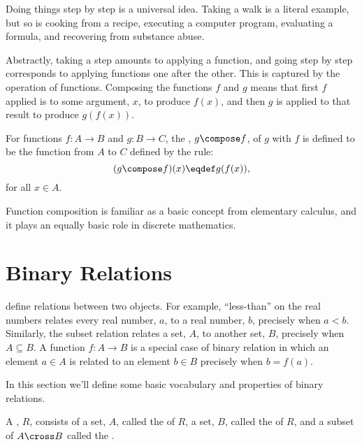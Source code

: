 Doing things step by step is a universal idea.  Taking a walk is a literal
example, but so is cooking from a recipe, executing a computer program,
evaluating a formula, and recovering from substance abuse.

Abstractly, taking a step amounts to applying a function, and going step
by step corresponds to applying functions one after the other.  This is
captured by the operation of  functions.  Composing the
functions $f$ and $g$ means that first $f$ applied is to some argument,
$x$, to produce $f(x)$, and then $g$ is applied to that result to produce
$g(f(x))$.

\begin{definition}\label{func_compose_def}
  For functions $f:A \to B$ and $g:B \to C$, the ,
  $g \compose f$, of $g$ with $f$ is defined to be the function
  from $A$ to $C$ defined by the rule:
\begin{displaymath}
(g \compose f)(x) \eqdef g(f(x)),
\end{displaymath}
for all $x \in A$.
\end{definition}

Function composition is familiar as a basic concept from elementary
calculus, and it plays an equally basic role in discrete mathematics.

\section{Binary Relations}\label{rel_sec}

 define relations between two objects.  For
example, ``less-than'' on the real numbers relates every real number, $a$,
to a real number, $b$, precisely when $a < b$. Similarly, the subset
relation relates a set, $A$, to another set, $B$, precisely when $A
\subseteq B$.  A function $f:A \to B$ is a special case of binary relation
in which an element $a \in A$ is related to an element $b \in B$ precisely
when $b = f(a)$.

In this section we'll define some basic vocabulary and properties of binary
relations.

\begin{definition}\label{reldef}
A , $R$, consists of a set, $A$, called
the  of $R$, a set, $B$, called the  of $R$, and
a subset of $A \cross B$ called the .
\end{definition}

